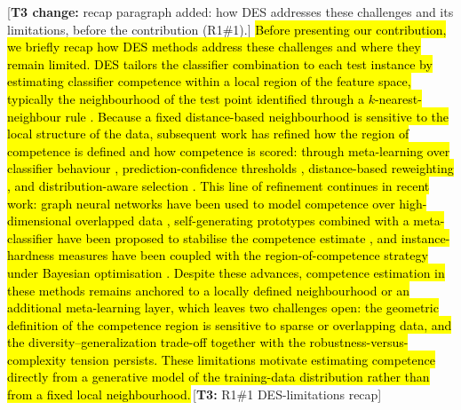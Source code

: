 \documentclass[lettersize,journal]{IEEEtran}
\newcommand{\tchange}[2]{\hl{#1}\,\textcolor{tier3note}{\footnotesize[\textbf{T3:} #2]}}
\newcommand{\tnote}[1]{\textcolor{tier3note}{\footnotesize[\textbf{T3 change:} #1]}}
\begin{document}
	\tnote{recap paragraph added: how DES addresses these challenges and its limitations, before the contribution (R1\#1).} \tchange{Before presenting our contribution, we briefly recap how DES methods address these challenges and where they remain limited. DES tailors the classifier combination to each test instance by estimating classifier competence within a local region of the feature space, typically the neighbourhood of the test point identified through a \mbox{$k$}-nearest-neighbour rule \mbox{\cite{ko_dynamic_2008, cruz_dynamic_2018}}. Because a fixed distance-based neighbourhood is sensitive to the local structure of the data, subsequent work has refined how the region of competence is defined and how competence is scored: through meta-learning over classifier behaviour \mbox{\cite{cruz_meta-oracle_2017}}, prediction-confidence thresholds \mbox{\cite{nguyen_ensemble_2020}}, distance-based reweighting \mbox{\cite{zhang_distance-based_2019}}, and distribution-aware selection \mbox{\cite{choi_ddes_2021}}. This line of refinement continues in recent work: graph neural networks have been used to model competence over high-dimensional overlapped data \mbox{\cite{souza_dynamic_2023}}, self-generating prototypes combined with a meta-classifier have been proposed to stabilise the competence estimate \mbox{\cite{manastarla_enhancing_2024}}, and instance-hardness measures have been coupled with the region-of-competence strategy under Bayesian optimisation \mbox{\cite{aziz_road_2024}}. Despite these advances, competence estimation in these methods remains anchored to a locally defined neighbourhood or an additional meta-learning layer, which leaves two challenges open: the geometric definition of the competence region is sensitive to sparse or overlapping data, and the diversity--generalization trade-off \mbox{\cite{lessmann_benchmarking_2015}} together with the robustness-versus-complexity tension \mbox{\cite{ditzler_learning_2015}} persists. These limitations motivate estimating competence directly from a generative model of the training-data distribution rather than from a fixed local neighbourhood.}{R1\#1 DES-limitations recap}
\end{document}
